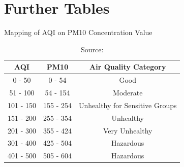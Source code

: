 \documentclass[12pt,a4paper]{article}
\begin{document}
{\vfill
\clearpage
\section{Further Tables}
\begin{table}[h]
 \caption{Mapping of AQI on PM10 Concentration Value} 
  \label{T:A1} 
\center \vspace{-0.5cm}
\begin{tabular}{|c|c|c|}
\hline
AQI & PM10 & Air Quality Category \\\hline
0 - 50 & 0 - 54 & Good \\
51 - 100 & 54 - 154 & Moderate \\
101 - 150 & 155 - 254 & Unhealthy for Sensitive Groups \\
151 - 200 & 255 - 354 & Unhealthy \\
201 - 300 & 355 - 424 & Very Unhealthy \\
301 - 400 & 425 - 504  & Hazardous \\
401 - 500 & 505 - 604 & Hazardous \\
\hline
\end{tabular}
\vspace{0.2cm}\caption*{Source: \citeauthor{EPA}}
\end{table}

}
\end{document}
